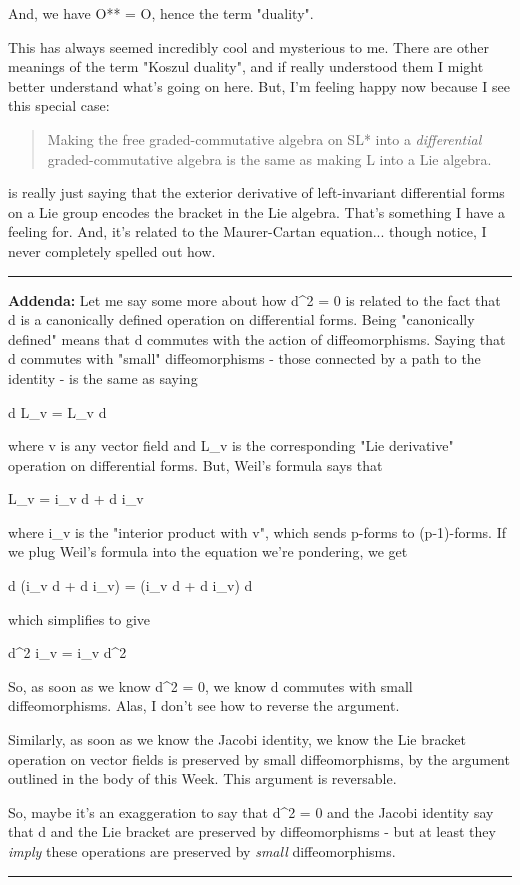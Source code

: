 And, we have O** = O, hence the term "duality".

This has always seemed incredibly cool and mysterious to me.
There are other meanings of the term "Koszul duality", and if 
really understood them I might better understand what's going on
here.  But, I'm feeling happy now because I see this special case:

\begin{quote}
 Making the free graded-commutative algebra on SL* into a \emph{differential}
 graded-commutative algebra is the same as making L into a Lie algebra.  
\end{quote}

is really just saying that the exterior derivative of left-invariant
differential forms on a Lie group encodes the bracket in the Lie algebra.
That's something I have a feeling for.  And, it's related to the 
Maurer-Cartan equation... though notice, I never completely spelled out
how.


\par\noindent\rule{\textwidth}{0.4pt}

\textbf{Addenda:} Let me say some more about how d^{2} = 0 is
related to the fact that d is a canonically defined operation on
differential forms.  Being "canonically defined" means that
d commutes with the action of diffeomorphisms.  Saying that d commutes
with "small" diffeomorphisms - those connected by a path to
the identity - is the same as saying

d L_{v} = L_{v} d

where v is any vector field and L_{v} is the corresponding
"Lie derivative" operation on differential forms.  But,
Weil's formula says that

L_{v} = i_{v} d + d i_{v}

where i_{v} is the "interior product with v", which
sends p-forms to (p-1)-forms.  If we plug Weil's formula into the
equation we're pondering, we get

d (i_{v} d + d i_{v}) = (i_{v} d + d i_{v}) d

which simplifies to give

d^{2} i_{v} = i_{v} d^{2}

So, as soon as we know d^{2} = 0, we know d commutes with small 
diffeomorphisms.   Alas, I don't see how to reverse the argument.

Similarly, as soon as we know the Jacobi identity, we know the
Lie bracket operation on vector fields is preserved by small
diffeomorphisms, by the argument outlined in the body of this Week.
This argument is reversable.

So, maybe it's an exaggeration to say that d^{2} = 0 and the Jacobi
identity say that d and the Lie bracket are preserved by 
diffeomorphisms - but at least they \emph{imply} these operations are 
preserved by \emph{small} diffeomorphisms.

\par\noindent\rule{\textwidth}{0.4pt}
